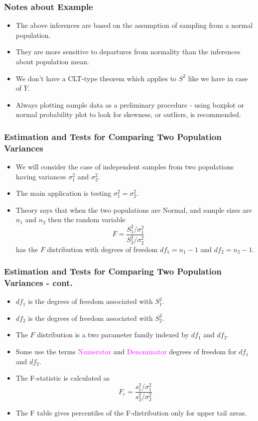 \documentclass[xcolor=dvipsnames,12pt]{beamer}
\begin{document}
\begin{frame}
\frametitle{Notes about Example}
\begin{itemize}
\item The above inferences are based on the assumption of sampling from a
normal population.  
\item They are more sensitive to departures from
normality than the inferences about population mean.  
\item We don't have a CLT-type theorem which applies to $S^2$ like we have
in case of $\bar{Y}$.
\item Always plotting sample data as a preliminary procedure - using 
boxplot or normal probability  plot to look for skewness, or
outliers, is  recommended.
\end{itemize}
\end{frame}

%
%
\begin{frame}
\frametitle{Estimation and Tests for Comparing Two
Population Variances}
\begin{itemize}
\item We will consider the case of independent samples from two
populations having variances $\sigma_1^2$ and $\sigma_2^2$.
\item The main application is testing  $\sigma_1^2 = \sigma_2^2$.
\item Theory says that when the two populations are Normal, and sample
sizes are $n_1$ and $n_2$ then the random variable
$$
  F = \frac{S_1^2/\sigma_1^2}{S_2^2/\sigma_2^2} \qquad 
$$
has the $F$ distribution with degrees of freedom $df_1 = n_1-1$ and $df_2 = n_2 - 1$. 
\end{itemize}
\end{frame}


\begin{frame}
\frametitle{Estimation and Tests for Comparing Two
Population Variances - cont.}
\begin{itemize}
\item $df_1$ is the degrees of freedom associated with $S_1^2$. 
\item $df_2$ is the degrees of freedom associated with $S_2^2$. 
\item The $F$ distribution is a two parameter family indexed by
$df_1$ and $df_2$.  
\item Some use the terms \textcolor{magenta}{Numerator} and  \textcolor{magenta}{Denominator} degrees of freedom for $df_1$ and $df_2$.
\item The F-statistic is calculated as 
$$
  F_c = \frac{s_1^2/\sigma_1^2}{s_2^2/\sigma_2^2} 
$$
\item The F table gives percentiles of the F-distribution only for upper tail areas.
\end{itemize}
\end{frame}
\end{document}
